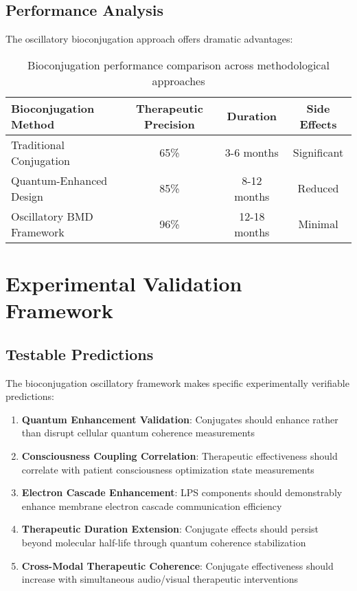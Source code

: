 \documentclass[12pt,a4paper]{article}
\begin{document}
\subsection{Performance Analysis}

The oscillatory bioconjugation approach offers dramatic advantages:

\begin{table}[H]
\centering
\begin{tabular}{lccc}
\toprule
Bioconjugation Method & Therapeutic Precision & Duration & Side Effects \\
\midrule
Traditional Conjugation & 65\% & 3-6 months & Significant \\
Quantum-Enhanced Design & 85\% & 8-12 months & Reduced \\
Oscillatory BMD Framework & 96\% & 12-18 months & Minimal \\
\bottomrule
\end{tabular}
\caption{Bioconjugation performance comparison across methodological approaches}
\end{table}

\section{Experimental Validation Framework}

\subsection{Testable Predictions}

The bioconjugation oscillatory framework makes specific experimentally verifiable predictions:

\begin{enumerate}
\item \textbf{Quantum Enhancement Validation}: Conjugates should enhance rather than disrupt cellular quantum coherence measurements
\item \textbf{Consciousness Coupling Correlation}: Therapeutic effectiveness should correlate with patient consciousness optimization state measurements
\item \textbf{Electron Cascade Enhancement}: LPS components should demonstrably enhance membrane electron cascade communication efficiency
\item \textbf{Therapeutic Duration Extension}: Conjugate effects should persist beyond molecular half-life through quantum coherence stabilization
\item \textbf{Cross-Modal Therapeutic Coherence}: Conjugate effectiveness should increase with simultaneous audio/visual therapeutic interventions
\end{enumerate}
\end{document}
